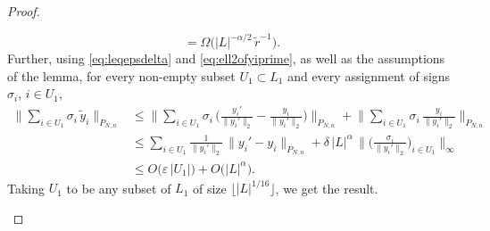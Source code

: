 \documentclass[11pt]{amsart}
\theoremstyle{definition}
\theoremstyle{plain}
\begin{document}
\begin{proof}
\begin{itemize}
$$    =\Omega\big(|L|^{-\alpha/2}\,{\tilde r}^{-1}\big).
    $$
    Further, using \eqref{eq:leqepsdelta} and \eqref{eq:ell2ofyiprime},
    as well as the assumptions of the lemma,
    for every non-empty subset $U_1\subset L_1$
    and every assignment of signs $\sigma_i$, $i\in U_1$,
    \begin{align*}
    \Big\|
    \sum_{i\in U_1}\sigma_i\,\tilde y_i
    \Big\|_{P_{N,n}}
    &\leq
    \Big\|
    \sum_{i\in U_1}\sigma_i\,\Big(\frac{y_i'}{\|y_i'\|_2}
    -
    \frac{y_i}{\|y_i'\|_2}
    \Big)
    \Big\|_{P_{N,n}}
    +
    \Big\|
    \sum_{i\in U_1}\sigma_i\,\frac{y_i}{\|y_i'\|_2}
    \Big\|_{P_{N,n}}\\
    &\leq 
    \sum_{i\in U_1} \frac{1}{\|y_i'\|_2}\,\|y_i'-y_i\|_{P_{N,n}}
    +\delta\,|L|^{\alpha}\,\Big\|\Big(\frac{\sigma_i}{\|y_i'\|_2}\Big)_{i\in U_1}\Big\|_{\infty}
    \\
    &\leq O\big(\varepsilon\,|U_1|\big)+
    O\big(|L|^{\alpha}\big).
    \end{align*}
    Taking $U_1$ to be any subset of $L_1$
    of size $\big\lfloor|L|^{1/16}\big\rfloor$,
    we get the result.


\end{itemize}
\end{proof}
\end{document}
